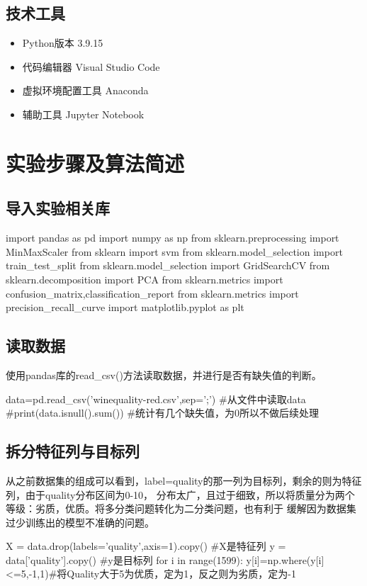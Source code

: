 \documentclass[UTF8]{ctexart}
\begin{document}
        \subsection{技术工具}
        \begin{itemize}
            \item Python版本 3.9.15
            \item 代码编辑器 Visual Studio Code
            \item 虚拟环境配置工具 Anaconda
            \item 辅助工具 Jupyter Notebook
        \end{itemize}
    \section{实验步骤及算法简述}
        \subsection{导入实验相关库}
            \begin{python}
import pandas as pd
import numpy as np
from sklearn.preprocessing import MinMaxScaler
from sklearn import svm
from sklearn.model_selection import train_test_split
from sklearn.model_selection import GridSearchCV
from sklearn.decomposition import PCA
from sklearn.metrics import confusion_matrix,classification_report 
from sklearn.metrics import precision_recall_curve
import matplotlib.pyplot as plt               
            \end{python}
        \subsection{读取数据}
        使用pandas库的read\_csv()方法读取数据，并进行是否有缺失值的判断。
            \begin{python}
data=pd.read_csv('winequality-red.csv',sep=';') #从文件中读取data
#print(data.isnull().sum())  #统计有几个缺失值，为0所以不做后续处理
            \end{python}
        \subsection{拆分特征列与目标列}
        从之前数据集的组成可以看到，label=quality的那一列为目标列，剩余的则为特征列，由于quality分布区间为0-10，
        分布太广，且过于细致，所以将质量分为两个等级：劣质，优质。将多分类问题转化为二分类问题，也有利于
        缓解因为数据集过少训练出的模型不准确的问题。
            \begin{python}
X = data.drop(labels='quality',axis=1).copy()	#X是特征列
y = data['quality'].copy()	                    #y是目标列
for i in range(1599):
    y[i]=np.where(y[i]<=5,-1,1)#将Quality大于5为优质，定为1，反之则为劣质，定为-1
            \end{python}
\end{document}
